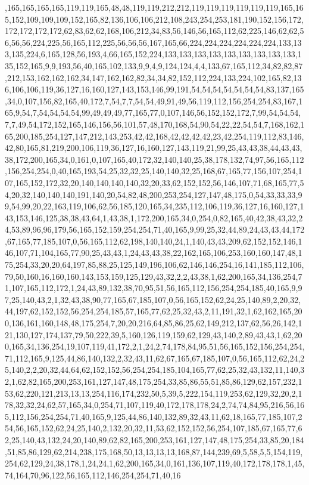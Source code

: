 ,165,165,165,165,119,119,165,48,48,119,119,212,212,119,119,119,119,119,119,165,165,152,109,109,109,152,165,82,136,106,106,212,108,243,254,253,181,190,152,156,172,172,172,172,172,62,83,62,62,168,106,212,34,83,56,146,56,165,112,62,225,146,62,62,56,56,56,224,225,56,165,112,225,56,56,56,167,165,66,224,224,224,224,224,224,133,133,135,224,6,165,128,56,193,4,66,165,152,224,133,133,133,133,133,133,133,133,133,135,152,165,9,9,193,56,40,165,102,133,9,9,4,9,124,124,4,4,133,67,165,112,34,82,82,87,212,153,162,162,162,34,147,162,162,82,34,34,82,152,112,224,133,224,102,165,82,136,106,106,119,36,127,16,160,127,143,153,146,99,191,54,54,54,54,54,54,54,83,137,165,34,0,107,156,82,165,40,172,7,54,7,7,54,54,49,91,49,56,119,112,156,254,254,83,167,165,9,54,7,54,54,54,54,99,49,49,49,77,165,77,0,107,146,56,152,152,172,7,99,54,54,54,7,7,49,54,172,152,165,146,156,56,101,57,48,170,168,54,90,54,22,22,54,54,7,168,162,165,200,185,254,127,147,212,143,253,42,42,168,42,42,42,42,23,42,254,119,112,83,146,42,80,165,81,219,200,106,119,36,127,16,160,127,143,119,21,99,25,43,43,38,44,43,43,38,172,200,165,34,0,161,0,107,165,40,172,32,140,140,25,38,178,132,74,97,56,165,112,156,254,254,0,40,165,193,54,25,32,32,25,140,140,32,25,168,67,165,77,156,107,254,107,165,152,172,32,20,140,140,140,140,32,20,33,62,152,152,56,146,107,71,68,165,77,54,20,32,140,140,140,191,140,20,54,82,48,200,253,254,127,147,48,175,0,54,33,33,33,99,54,99,20,22,163,119,106,62,56,185,120,165,34,235,112,106,119,36,127,16,160,127,143,153,146,125,38,38,43,64,1,43,38,1,172,200,165,34,0,254,0,82,165,40,42,38,43,32,24,53,89,96,96,179,56,165,152,159,254,254,71,40,165,9,99,25,32,44,89,24,43,43,44,172,67,165,77,185,107,0,56,165,112,62,198,140,140,24,1,140,43,43,209,62,152,152,146,146,107,71,104,165,77,90,25,43,43,1,24,43,43,38,22,162,165,106,253,160,160,147,48,175,254,33,20,20,64,197,85,88,25,125,149,196,106,62,146,146,254,16,141,185,112,106,79,50,160,16,160,160,143,153,159,125,129,43,32,2,2,43,38,1,62,200,165,34,136,254,71,107,165,112,172,1,24,43,89,132,38,70,95,51,56,165,112,156,254,254,185,40,165,9,97,25,140,43,2,1,32,43,38,90,77,165,67,185,107,0,56,165,152,62,24,25,140,89,2,20,32,44,197,62,152,152,56,254,254,185,57,165,77,62,25,32,43,2,11,191,32,1,62,162,165,200,136,161,160,148,48,175,254,7,20,20,216,64,85,86,25,62,149,212,137,62,56,26,142,121,130,127,174,137,79,50,222,39,5,160,126,119,159,62,129,43,140,2,89,43,43,1,62,200,165,34,136,254,19,107,119,41,172,2,1,24,2,74,178,84,95,51,56,165,152,156,254,254,71,112,165,9,125,44,86,140,132,2,32,43,11,62,67,165,67,185,107,0,56,165,112,62,24,25,140,2,2,20,32,44,64,62,152,152,56,254,254,185,104,165,77,62,25,32,43,132,11,140,32,1,62,82,165,200,253,161,127,147,48,175,254,33,85,86,55,51,85,86,129,62,157,232,153,62,220,121,213,13,13,254,116,174,232,50,5,39,5,222,154,119,253,62,129,32,20,2,178,32,32,24,62,57,165,34,0,254,71,107,119,40,172,178,178,24,2,74,74,84,95,216,56,165,112,156,254,254,71,40,165,9,125,44,86,140,132,89,32,43,11,62,18,165,77,185,107,254,56,165,152,62,24,25,140,2,132,20,32,11,53,62,152,152,56,254,107,185,67,165,77,62,25,140,43,132,24,20,140,89,62,82,165,200,253,161,127,147,48,175,254,33,85,20,184,51,85,86,129,62,214,238,175,168,50,13,13,13,13,168,87,144,239,69,5,58,5,5,154,119,254,62,129,24,38,178,1,24,24,1,62,200,165,34,0,161,136,107,119,40,172,178,178,1,45,74,164,70,96,122,56,165,112,146,254,254,71,40,16